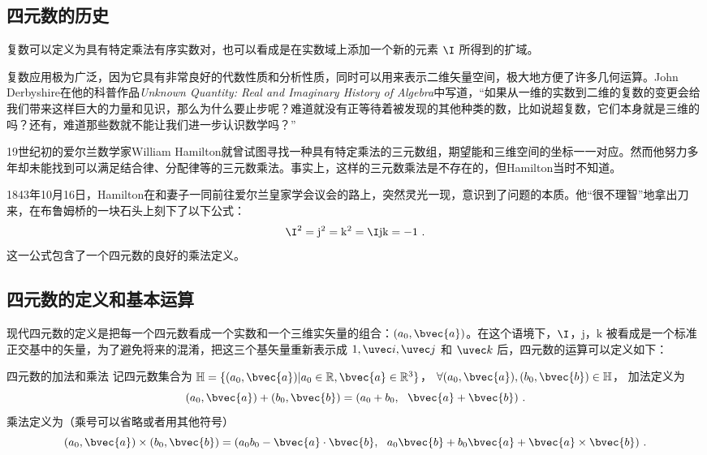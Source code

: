 

\subsection{四元数的历史}

复数可以定义为具有特定乘法有序实数对，也可以看成是在实数域上添加一个新的元素 $\I$ 所得到的扩域。

复数应用极为广泛，因为它具有非常良好的代数性质和分析性质，同时可以用来表示二维矢量空间，极大地方便了许多几何运算。John Derbyshire在他的科普作品\textsl{Unknown Quantity: Real and Imaginary History of Algebra}中写道，“如果从一维的实数到二维的复数的变更会给我们带来这样巨大的力量和见识，那么为什么要止步呢？难道就没有正等待着被发现的其他种类的数，比如说超复数，它们本身就是三维的吗？还有，难道那些数就不能让我们进一步认识数学吗？”

19世纪初的爱尔兰数学家William Hamilton就曾试图寻找一种具有特定乘法的三元数组，期望能和三维空间的坐标一一对应。然而他努力多年却未能找到可以满足结合律、分配律等的三元数乘法。事实上，这样的三元数乘法是不存在的，但Hamilton当时不知道。

1843年10月16日，Hamilton在和妻子一同前往爱尔兰皇家学会议会的路上，突然灵光一现，意识到了问题的本质。他“很不理智”地拿出刀来，在布鲁姆桥的一块石头上刻下了以下公式：
\begin{equation}
\I^2=\mathrm{j}^2=\mathrm{k}^2=\I\mathrm{j}\mathrm{k}=-1~.
\end{equation}
这一公式包含了一个四元数的良好的乘法定义。

\subsection{四元数的定义和基本运算}

现代四元数的定义是把每一个四元数看成一个实数和一个三维实矢量的组合：$(a_0, \bvec{a})$。在这个语境下，$\I$，$\mathrm{j}$，$\mathrm{k}$ 被看成是一个标准正交基中的矢量，为了避免将来的混淆，把这三个基矢量重新表示成 $1, \uvec i, \uvec j$ 和 $\uvec k$ 后，四元数的运算可以定义如下：

\begin{definition}{四元数的加法和乘法}\label{def_Quat_1}
记四元数集合为 $\mathbb{H}=\{(a_0, \bvec{a})|a_0\in\mathbb{R}, \bvec{a}\in\mathbb{R}^3\}$， $\forall(a_0, \bvec{a}), (b_0, \bvec{b})\in\mathbb{H}$， 加法定义为
\begin{equation}
(a_0, \bvec{a})+ (b_0, \bvec{b})=(a_0+b_0,\ \ \bvec{a}+\bvec{b})~.
\end{equation}
乘法定义为（乘号可以省略或者用其他符号）
\begin{equation}\label{eq_Quat_1}
(a_0, \bvec{a})\times (b_0, \bvec{b})=(a_0b_0-\bvec{a}\cdot\bvec{b},\ \ a_0\bvec{b}+b_0\bvec{a}+\bvec{a}\times\bvec{b})~.
\end{equation}
\end{definition}

